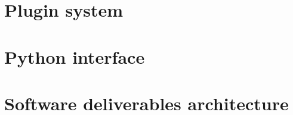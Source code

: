 \documentclass[a4paper,twoside,openright,makeidx,12pt]{book}
\begin{document}
\label{Sec:DDD-Loading}

\label{Sec:DDD-XMLManagement}

\label{Sec:DDD-XMLLoading}





\newpage
\chapter{Plugin system}
\label{Sec:DDD-Pluginsystem}


\newpage
\chapter{Python interface}
\label{Sec:DDD-pyInterface}

%


\newpage
\chapter{Software deliverables architecture}
\label{Sec:DDD-SoftwareDeliverablesArchitecture}

\end{document}
